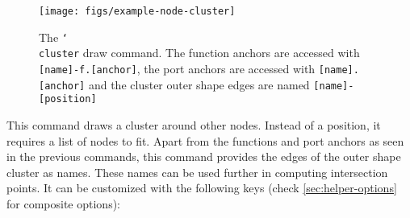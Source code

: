 \begin{figure}[htb]\centering
\texttt{[image: figs/example-node-cluster]}

\caption{The \texttt{\char`\\cluster} draw command. The function anchors are accessed with \texttt{[name]-f.[anchor]}, the port anchors are accessed with \texttt{[name].[anchor]} and the cluster outer shape edges are named \texttt{[name]-[position]}}
\end{figure}
\hspace{1pt}

\noindent This command draws a cluster around other nodes. Instead of a position, it requires a list of nodes to fit. Apart from the functions and port anchors as seen in the previous commands, this command provides the edges of the outer shape cluster as names. These names can be used further in computing intersection points. It can be customized with the following keys (check \ref{sec:helper-options} for composite options):

